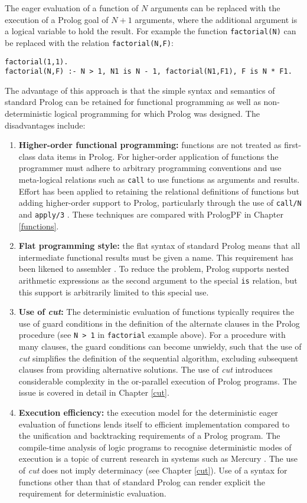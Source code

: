 The eager evaluation of a function of $N$ arguments can be replaced with the
execution of a Prolog goal of $N+1$ arguments,
where the additional argument is a logical variable to hold the
result.  For example the function \texttt{factorial(N)} can be
replaced with the relation \texttt{factorial(N,F)}:
\begin{verbatim}
factorial(1,1).
factorial(N,F) :- N > 1, N1 is N - 1, factorial(N1,F1), F is N * F1.
\end{verbatim}
The advantage of this approach is that the simple syntax and semantics of standard
Prolog can be retained for functional programming as well as non-deterministic logical
programming for which Prolog was designed.  The disadvantages include:
\begin{enumerate}
\item{\textbf{Higher-order functional programming:}  functions are not treated as
  first-class data items in Prolog.  For higher-order application of functions the
  programmer must adhere to arbitrary programming conventions and use meta-logical
  relations such as \texttt{call} to use functions as arguments and results.  Effort
  has been applied to retaining the relational definitions of functions but adding
  higher-order support to Prolog, particularly through the use of \texttt{call/N}
  \cite{SHC95,Nai96} and \texttt{apply/3} \cite{Nai96}.  These techniques are
  compared with PrologPF in Chapter \ref{functions}.}
\item{\textbf{Flat programming style:} the flat syntax of standard Prolog means that
  all intermediate functional results must be given a name.  This requirement has
  been likened to assembler \cite{App92}.  To reduce the problem, Prolog supports
  nested arithmetic expressions as the second argument to the special \texttt{is}
  relation, but this support is arbitrarily limited to this special use.}
\item{\textbf{Use of \textit{cut}:} The deterministic evaluation of functions typically
  requires the use of guard conditions in the definition of the alternate clauses in the
  Prolog procedure (see \texttt{N > 1} in \texttt{factorial} example above).  For a
  procedure with many clauses, the guard conditions can become unwieldy, such that the
  use of \textit{cut} simplifies the definition of the sequential algorithm, excluding
  subsequent clauses from providing alternative solutions.  The use of \textit{cut}
  introduces considerable complexity in the or-parallel execution of Prolog programs.
  The issue is covered in detail in Chapter \ref{cut}.}
\item{\textbf{Execution efficiency:} the execution model for
  the deterministic eager evaluation of functions lends itself to efficient implementation
  compared to the unification and backtracking requirements of a Prolog program.  The
  compile-time analysis of logic programs to recognise deterministic modes of execution
  is a topic of current research in systems such as Mercury \cite{HCSR95}.  The use of
  \textit{cut} does not imply determinacy (see Chapter \ref{cut}).  Use of a syntax 
  for functions other than that of standard Prolog can render explicit the requirement for
  deterministic evaluation.}
\end{enumerate}

